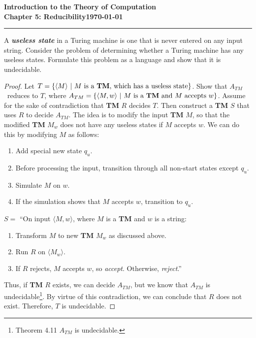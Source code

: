 \documentclass[11pt]{article}
\newcommand{\dated}{\today}
\begin{document}
\textbf{Introduction to the Theory of
Computation}\hfill\textbf{\myname}\\[0.01in]
\textbf{Chapter 5: Reducibility}\hfill\textbf{\dated}\\
\smallskip\hrule\bigskip

\begin{problem}{5.13}
A \textbf{\textit{useless state}} in a Turing machine is one that is never entered on any input string. Consider the problem of determining whether a Turing machine has any useless states. Formulate this problem as a language and show that it is undecidable.
\end{problem}

\begin{proof}
Let $T = \{\langle M \rangle \ | \ M \text{ is a \textbf{TM}, which has a useless state}\}$. Show that $A_{TM}$\ reduces to $T$, where $A_{TM} = \{\langle M, w \rangle \ | \ M \text{ is a \textbf{TM} and } M \text{ accepts } w\}$. Assume for the sake of contradiction that \textbf{TM} $R$ decides $T$. Then construct a \textbf{TM} $S$ that uses $R$ to decide $A_{TM}$. The idea is to modify the input \textbf{TM} $M$, so that the modified \textbf{TM} $M_w$ does not have any useless states if $M$ accepts $w$. We can do this by modifying $M$ as follows:
\begin{enumerate}
\item Add special new state $q_u$.
\item Before processing the input, transition through all non-start states except $q_u$.
\item Simulate $M$ on $w$.
\item If the simulation shows that $M$ accepts $w$, transition to $q_u$.
\end{enumerate}

$S =$ \textquotedblleft On input $\langle M, w \rangle$, where $M$ is a \textbf{TM} and $w$ is a string:
\begin{enumerate}
\item Transform $M$ to new \textbf{TM} $M_w$ as discussed above.
\item Run $R$ on $\langle M_w \rangle$.
\item If $R$ rejects, $M$ accepts $w$, so \textit{accept}. Otherwise, \textit{reject}.\textquotedblright
\end{enumerate}
Thus, if \textbf{TM} $R$ exists, we can decide $A_{TM}$, but we know that $A_{TM}$ is undecidable\footnote{Theorem 4.11 $A_{TM}$ is undecidable.}. By virtue of this contradiction, we can conclude that $R$ does not exist. Therefore, $T$ is undecidable.
\end{proof}
\end{document}
